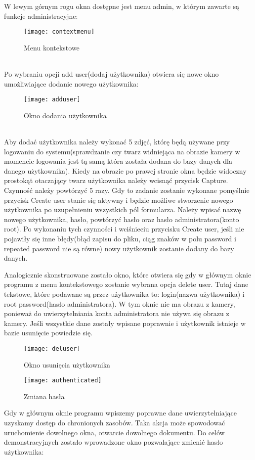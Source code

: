 \documentclass[eng,printmode]{mgr}
\begin{document}
W lewym górnym rogu okna dostępne jest menu admin, w którym zawarte są funkcje administracyjne:\\
\begin{figure}[placement h]
\texttt{[image: contextmenu]}
\caption{Menu kontekstowe}
\end{figure}\\

Po wybraniu opcji add user(dodaj użytkownika) otwiera się nowe okno umożliwiające dodanie nowego użytkownika:\\
\begin{figure}[placement h]
\texttt{[image: adduser]}
\caption{Okno dodania użytkownika}
\end{figure}\\
Aby dodać użytkownika należy wykonać 5 zdjęć, którę będą używane przy logowaniu do systemu(sprawdzanie czy twarz widniejąca na obrazie kamery w momencie logowania jest tą samą która została dodana do bazy danych dla danego użytkownika). Kiedy na obrazie po prawej stronie okna będzie widoczny prostokąt otaczający twarz użytkownika należy wcisnąć przycisk Capture. Czynność należy powtórzyć 5 razy. Gdy to zadanie zostanie wykonane pomyślnie przycisk Create user stanie się aktywny i będzie możliwe stworzenie nowego użytkownika po uzupełnieniu wszystkich pól formularza. Należy wpisać nazwę nowego użytkownika, hasło, powtórzyć hasło oraz hasło administratora(konto root). Po wykonaniu tych czynności i wciśnieciu przycisku Create user, jeśli nie pojawiły się inne błędy(błąd zapisu do pliku, ciąg znaków w polu password i repeated password nie są równe) nowy użytkownik zostanie dodany do bazy danych.

Analogicznie skonstruowane zostało okno, które otwiera się gdy w głównym oknie programu z menu kontekstowego zostanie wybrana opcja delete user. Tutaj dane tekstowe, które podawane są przez użytkownika to: login(nazwa użytkownika) i root password(hasło administratora). W tym oknie nie ma obrazu z kamery, ponieważ do uwierzytelniania konta administratora nie używa się obrazu z kamery. Jeśli wszystkie dane zostały wpisane poprawnie i użytkownik istnieje w bazie usunięcie powiedzie się.\\
\begin{figure}[placement h]
\texttt{[image: deluser]}
\caption{Okno usunięcia użytkownika}
\end{figure}

\begin{figure}[placement H]
\texttt{[image: authenticated]}
\caption{Zmiana hasła}
\end{figure}
Gdy w głównym oknie programu wpiszemy poprawne dane uwierzytelniające uzyskamy dostęp do chronionych zasobów. Taka akcja może spowodować uruchomienie dowolnego okna, otwarcie dowolnego dokumentu. Do celów demonstracyjnych zostało wprowadzone okno pozwalające zmienić hasło użytkownika:\\
\end{document}
